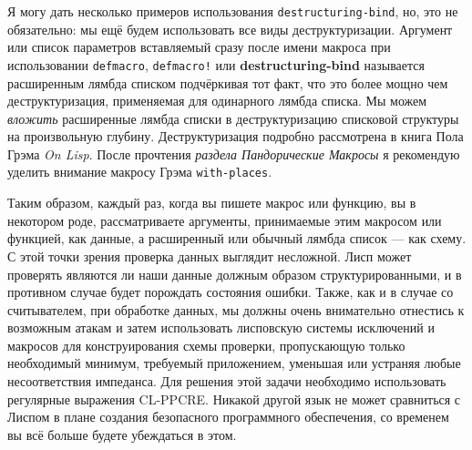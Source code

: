 Я могу дать несколько примеров использования \verb"destructuring-bind", но, это не обязательно: мы ещё будем использовать все виды деструктуризации. Аргумент или список параметров вставляемый сразу после имени макроса при использовании \verb"defmacro", \verb"defmacro!" или \textbf{de\-struc\-tu\-ring-bi\-nd} называется расширенным лямбда списком подчёркивая тот факт, что это более мощно чем деструктуризация, применяемая для одинарного лямбда списка. Мы можем \emph{вложить} расширенные лямбда списки в деструктуризацию списковой структуры на произвольную глубину. Деструктуризация подробно рассмотрена в книга Пола Грэма \emph{On Lisp}. После прочтения \emph{раздела Пандорические Макросы} я рекомендую уделить внимание макросу Грэма \verb"with-places".

Таким образом, каждый раз, когда вы пишете макрос или функцию, вы в некотором роде, рассматриваете аргументы, принимаемые этим макросом или функцией, как данные, а расширенный или обычный лямбда список --- как схему. С этой точки зрения проверка данных выглядит несложной. Лисп может проверять являются ли наши данные должным образом структурированными, и в противном случае будет порождать состояния ошибки. Также, как и в случае со считывателем, при обработке данных, мы должны очень внимательно отнестись к возможным атакам и затем использовать лисповскую системы исключений и макросов для конструирования схемы проверки, пропускающую только необходимый минимум, требуемый приложением, уменьшая или устраняя любые несоответствия импеданса. Для решения этой задачи необходимо использовать регулярные выражения CL-PPCRE. Никакой другой язык не может сравниться с Лиспом в плане создания безопасного программного обеспечения, со временем вы всё больше будете убеждаться в этом.
